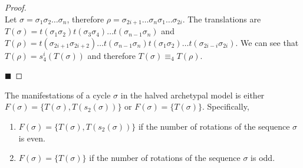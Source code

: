\begin{proof} \phantom{x} \\
	Let $\sigma = \sigma_1\sigma_2 \dots \sigma_n$, therefore $\rho = \sigma_{2i+1} \dots \sigma_n\sigma_1 \dots \sigma_{2i}$.
	The translations are $T(\sigma) = t(\sigma_1\sigma_2)t(\sigma_3\sigma_4) \dots t(\sigma_{n-1}\sigma_n)$
	and $T(\rho) = t(\sigma_{2i+1}\sigma_{2i+2}) \dots t(\sigma_{n-1}\sigma_n)t(\sigma_1\sigma_2) \dots t(\sigma_{2i-i}\sigma_{2i})$.
	We can see that $T(\rho) = s_4^i(T(\sigma))$ and therefore $T(\sigma) \equiv_4 T(\rho)$.

	\hfill $\blacksquare$
\end{proof}

\begin{theorem}
	\label{theorem:coexistence.even}
	The manifestations of a cycle $\sigma$ in the halved archetypal model is either $F(\sigma) = \{T(\sigma), T(s_2(\sigma))\}$ or $F(\sigma) = \{T(\sigma)\}$.
	Specifically, \begin{enumerate}
		\item $F(\sigma) = \{T(\sigma), T(s_2(\sigma))\}$ if the number of rotations of the sequence $\sigma$ is even.
		\item $F(\sigma) = \{T(\sigma)\}$ if the number of rotations of the sequence $\sigma$ is odd.
	\end{enumerate}
\end{theorem}

